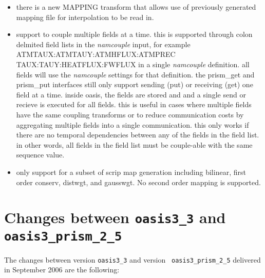 \begin{itemize}
\begin{itemize}
\item there is a new MAPPING transform that allows use of previously generated
  mapping file for interpolation to be read in.
\item support to couple multiple fields at a time.  this is supported through
  colon delmited field lists in the {\it namcouple} input, for example
  ATMTAUX:ATMTAUY:ATMHFLUX:ATMPREC TAUX:TAUY:HEATFLUX:FWFLUX in a single
  {\it namcouple} definition.  all fields will use the {\it namcouple} settings for
  that definition.  the prism\_get and prism\_put interfaces still only
  support sending (put) or receiving (get) one field at a time.  inside
  oasis, the fields are stored and and a single send or recieve is 
  executed for all fields.  this is useful in cases where multiple fields
  have the same coupling transforms or to reduce communication costs
  by aggregating multiple fields into a single communication.  this only
  works if there are no temporal dependencies between any of the fields
  in the field list.  in other words, all fields in the field list must
  be couple-able with the same sequence value.
\item only support for a subset of scrip map generation including bilinear,
  first order conserv, distwgt, and gausswgt.  No second order mapping is
  supported.
\end{itemize}

\end{itemize}


\section{Changes between {\tt oasis3\_3} and {\tt
oasis3\_prism\_2\_5}}

The changes between version {\tt oasis3\_3} and version {\tt
  oasis3\_prism\_2\_5} delivered in September 2006 are the following:

